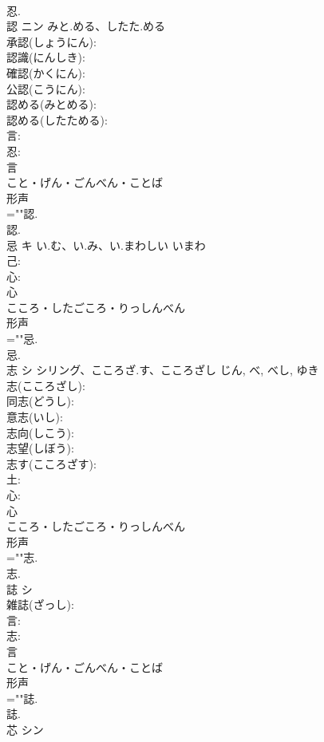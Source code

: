 \documentclass[8pt]{extreport}
\begin{document}
\begin{CJK}{UTF8}{min}
\\	忍.
\\	認	ニン	みと.める、したた.める		
\\	承認(しょうにん): 
\\	認識(にんしき): 
\\	確認(かくにん): 
\\	公認(こうにん): 
\\	認める(みとめる): 
\\	認める(したためる): 
\\	言: 
\\	忍: 
\\	言	
\\	こと・げん・ごんべん・ことば	
\\	形声 
\\	=""認.
\\	認.
\\	忌	キ	い.む、い.み、い.まわしい	いまわ	
\\	己: 
\\	心: 
\\	心	
\\	こころ・したごころ・りっしんべん	
\\	形声 
\\	=""忌.
\\	忌.
\\	志	シ	シリング、こころざ.す、こころざし	じん, べ, べし, ゆき	
\\	志(こころざし): 
\\	同志(どうし): 
\\	意志(いし): 
\\	志向(しこう): 
\\	志望(しぼう): 
\\	志す(こころざす): 
\\	土: 
\\	心: 
\\	心	
\\	こころ・したごころ・りっしんべん	
\\	形声 
\\	=""志.
\\	志.
\\	誌	シ			
\\	雑誌(ざっし): 
\\	言: 
\\	志: 
\\	言	
\\	こと・げん・ごんべん・ことば	
\\	形声 
\\	=""誌.
\\	誌.
\\	芯	シン			

\end{CJK}
\end{document}
